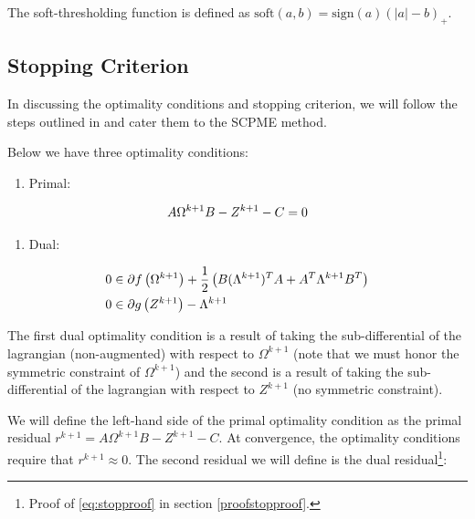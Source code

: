 \documentclass[11pt,]{report}
\providecommand{\tightlist}{%
  \setlength{\itemsep}{0pt}\setlength{\parskip}{0pt}}
\begin{document}
The soft-thresholding function is defined as \(\mbox{soft}(a, b) = \mbox{sign}(a)(\left| a \right| - b)_{+}\).

\hypertarget{stopping-criterion-1}{%
\subsection{Stopping Criterion}\label{stopping-criterion-1}}

In discussing the optimality conditions and stopping criterion, we will follow the steps outlined in \citet{boyd2011distributed} and cater them to the SCPME method.

Below we have three optimality conditions:

\begin{enumerate}
\def\labelenumi{\arabic{enumi}.}
\tightlist
\item
  Primal:
\end{enumerate}

\begin{equation}
A\Omega^{k + 1}B - Z^{k + 1} - C = 0
\label{eq:scpmeprimal}\notag
\end{equation}

\begin{enumerate}
\def\labelenumi{\arabic{enumi}.}
\setcounter{enumi}{1}
\tightlist
\item
  Dual:
\end{enumerate}

\begin{equation}
\begin{split}
  0 &\in \partial f\left(\Omega^{k + 1}\right) + \frac{1}{2}\left(B(\Lambda^{k + 1})^{T}A + A^{T}\Lambda^{k + 1}B^{T} \right) \\
  0 &\in \partial g\left(Z^{k + 1}\right) - \Lambda^{k + 1}
\label{eq:scpmedual}\notag
\end{split}
\end{equation}

The first dual optimality condition is a result of taking the sub-differential of the lagrangian (non-augmented) with respect to \(\Omega^{k + 1}\) (note that we must honor the symmetric constraint of \(\Omega^{k + 1}\)) and the second is a result of taking the sub-differential of the lagrangian with respect to \(Z^{k + 1}\) (no symmetric constraint).

We will define the left-hand side of the primal optimality condition as the primal residual \(r^{k + 1} = A\Omega^{k + 1}B - Z^{k + 1} - C\). At convergence, the optimality conditions require that \(r^{k + 1} \approx 0\). The second residual we will define is the dual residual\footnote{Proof of \eqref{eq:stopproof} in section \ref{proofstopproof}.}:
\end{document}
